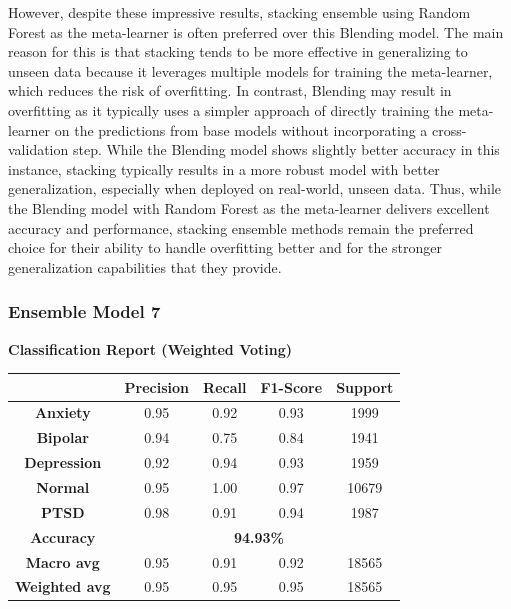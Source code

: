 \vspace{1em}

\noindent
However, despite these impressive results, stacking ensemble using Random Forest as the meta-learner is often preferred over this Blending model. The main reason for this is that stacking tends to be more effective in generalizing to unseen data because it leverages multiple models for training the meta-learner, which reduces the risk of overfitting. In contrast, Blending may result in overfitting as it typically uses a simpler approach of directly training the meta-learner on the predictions from base models without incorporating a cross-validation step. While the Blending model shows slightly better accuracy in this instance, stacking typically results in a more robust model with better generalization, especially when deployed on real-world, unseen data. Thus, while the Blending model with Random Forest as the meta-learner delivers excellent accuracy and performance, stacking ensemble methods remain the preferred choice for their ability to handle overfitting better and for the stronger generalization capabilities that they provide.

\pagebreak

\subsubsection{Ensemble Model 7}

\begin{center}
    \textbf{Classification Report (Weighted Voting)} \\[0.5em]
    \begin{tabular}{|c|c|c|c|c|}
        \hline
        & \textbf{Precision} & \textbf{Recall} & \textbf{F1-Score} & \textbf{Support} \\ \hline
        \textbf{Anxiety}    & 0.95 & 0.92 & 0.93 & 1999 \\ \hline
        \textbf{Bipolar}    & 0.94 & 0.75 & 0.84 & 1941 \\ \hline
        \textbf{Depression} & 0.92 & 0.94 & 0.93 & 1959 \\ \hline
        \textbf{Normal}     & 0.95 & 1.00 & 0.97 & 10679 \\ \hline
        \textbf{PTSD}       & 0.98 & 0.91 & 0.94 & 1987 \\ \hline
        \textbf{Accuracy}   & \multicolumn{4}{c|}{\textbf{94.93\%}} \\ \hline
        \textbf{Macro avg}  & 0.95 & 0.91 & 0.92 & 18565 \\ \hline
        \textbf{Weighted avg} & 0.95 & 0.95 & 0.95 & 18565 \\ \hline
    \end{tabular}
\end{center}

